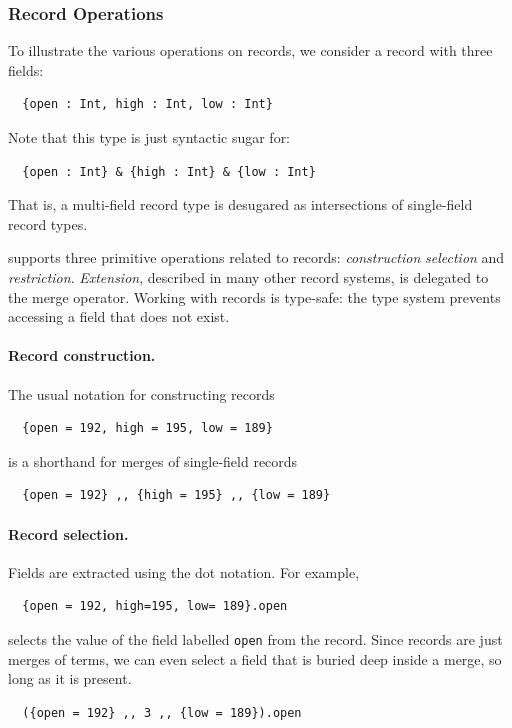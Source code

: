 \subsubsection{Record Operations}

To illustrate the various operations on records, we consider a record with three
fields:
\begin{lstlisting}
  {open : Int, high : Int, low : Int}
\end{lstlisting}
Note that this type is just syntactic sugar for:
\begin{lstlisting}
  {open : Int} & {high : Int} & {low : Int}
\end{lstlisting}
That is, a multi-field record type is desugared as intersections of single-field
record types.

\name supports three primitive operations related to records:
\textit{construction} \textit{selection} and \textit{restriction}.
\textit{Extension}, described in many other record systems, is delegated to the
merge operator. Working with records is type-safe: the type system prevents
accessing a field that does not exist.

\paragraph{Record construction.} The usual notation for constructing records
\begin{lstlisting}
  {open = 192, high = 195, low = 189}
\end{lstlisting}
is a shorthand for merges of single-field records
\begin{lstlisting}
  {open = 192} ,, {high = 195} ,, {low = 189}
\end{lstlisting}

\paragraph{Record selection.} Fields are extracted using the dot notation. For
example,
\begin{lstlisting}
  {open = 192, high=195, low= 189}.open
\end{lstlisting}
selects the value of the field labelled \lstinline{open} from the record. Since
records are just merges of terms, we can even select a field that is buried deep
inside a merge, so long as it is present.
\begin{lstlisting}
  ({open = 192} ,, 3 ,, {low = 189}).open
\end{lstlisting}

